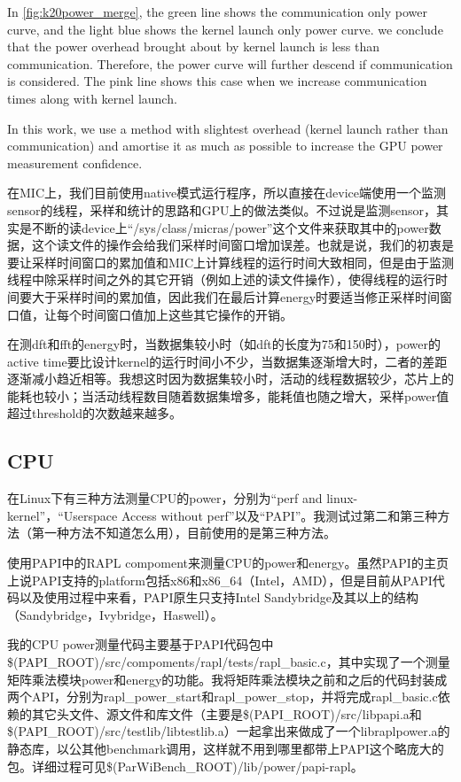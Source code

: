 \documentclass[titlepage]{article}
\numberwithin{figure}{section}
\numberwithin{equation}{section}
\begin{document}
In \ref{fig:k20power_merge}, the green line shows the communication only power curve, and the light blue shows the kernel launch only power curve. we conclude that the power overhead brought about by kernel launch is less than communication. Therefore, the power curve will further descend if communication is considered. The pink line shows this case when we increase communication times along with kernel launch.

In this work, we use a method with slightest overhead (kernel launch rather than communication) and amortise it as much as possible to increase the GPU power measurement confidence.


在MIC上，我们目前使用native模式运行程序，所以直接在device端使用一个监测sensor的线程，采样和统计的思路和GPU上的做法类似。不过说是监测sensor，其实是不断的读device上“/sys/class/micras/power”这个文件来获取其中的power数据，这个读文件的操作会给我们采样时间窗口增加误差。也就是说，我们的初衷是要让采样时间窗口的累加值和MIC上计算线程的运行时间大致相同，但是由于监测线程中除采样时间之外的其它开销（例如上述的读文件操作），使得线程的运行时间要大于采样时间的累加值，因此我们在最后计算energy时要适当修正采样时间窗口值，让每个时间窗口值加上这些其它操作的开销。

在测dft和fft的energy时，当数据集较小时（如dft的长度为75和150时），power的active time要比设计kernel的运行时间小不少，当数据集逐渐增大时，二者的差距逐渐减小趋近相等。我想这时因为数据集较小时，活动的线程数据较少，芯片上的能耗也较小；当活动线程数目随着数据集增多，能耗值也随之增大，采样power值超过threshold的次数越来越多。

\subsection{CPU}

在Linux下有三种方法测量CPU的power，分别为“perf and linux-kernel”，“Userspace Access without perf”以及“PAPI”。我测试过第二和第三种方法（第一种方法不知道怎么用），目前使用的是第三种方法。

使用PAPI\cite{papi}中的RAPL compoment来测量CPU的power和energy。虽然PAPI的主页上说PAPI支持的platform包括x86和x86_64（Intel，AMD），但是目前从PAPI代码以及使用过程中来看，PAPI原生只支持Intel Sandybridge及其以上的结构（Sandybridge，Ivybridge，Haswell）。

我的CPU power测量代码主要基于PAPI代码包中\$(PAPI_ROOT)/src/compoments/rapl/tests/rapl_basic.c，其中实现了一个测量矩阵乘法模块power和energy的功能。我将矩阵乘法模块之前和之后的代码封装成两个API，分别为rapl_power_start和rapl_power_stop，并将完成rapl_basic.c依赖的其它头文件、源文件和库文件（主要是\$(PAPI_ROOT)/src/libpapi.a和\$(PAPI_ROOT)/src/testlib/libtestlib.a）一起拿出来做成了一个libraplpower.a的静态库，以公其他benchmark调用，这样就不用到哪里都带上PAPI这个略庞大的包。详细过程可见\$(ParWiBench_ROOT)/lib/power/papi-rapl。
\end{document}
